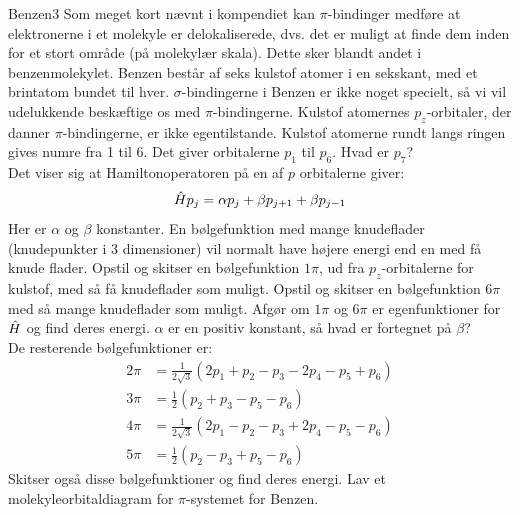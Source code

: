 \begin{opgave}{Benzen}{3}
Som meget kort nævnt i kompendiet kan $\pi$-bindinger medføre at elektronerne i et molekyle er delokaliserede, dvs. det er muligt at finde dem inden for et stort område (på molekylær skala). Dette sker blandt andet i benzenmolekylet. Benzen består af seks kulstof atomer i en sekskant, med et brintatom bundet til hver. $\sigma$-bindingerne i Benzen er ikke noget specielt, så vi vil udelukkende beskæftige os med $\pi$-bindingerne.
Kulstof atomernes $p_z$-orbitaler, der danner $\pi$-bindingerne, er ikke egentilstande. Kulstof atomerne rundt langs ringen gives numre fra 1 til 6. Det giver orbitalerne $p_1$ til $p_6$. 
\opg Hvad er $p_7$? \\
Det viser sig at Hamiltonoperatoren på en af $p$ orbitalerne giver:
$$
\hat H p_j = \alpha p_j+\beta p_{j+1}+\beta p_{j-1}
$$
Her er $\alpha$ og $\beta$ konstanter.
En bølgefunktion med mange knudeflader (knudepunkter i 3 dimensioner) vil normalt have højere energi end en med få knude flader.
\opg Opstil og skitser en bølgefunktion $1\pi$, ud fra $p_z$-orbitalerne for kulstof, med så få knudeflader som muligt.
\opg Opstil og skitser en bølgefunktion $6\pi$ med så mange knudeflader som muligt.
\opg Afgør om $1\pi$ og $6\pi$ er egenfunktioner for $\hat H$ og find deres energi.
\opg $\alpha$ er en positiv konstant, så hvad er fortegnet på $\beta$?\\ 
De resterende bølgefunktioner er:
\begin{align*}
2\pi &= \frac{1}{2\sqrt{3}}(2p_1+p_2-p_3-2p_4-p_5+p_6)\\
3\pi &= \frac{1}{2}(p_2+p_3-p_5-p_6)\\
4\pi &= \frac{1}{2\sqrt{3}}(2p_1-p_2-p_3+2p_4-p_5-p_6)\\
5\pi &= \frac{1}{2}(p_2-p_3+p_5-p_6)
\end{align*}
\opg Skitser også disse bølgefunktioner og find deres energi.
\opg Lav et molekyleorbitaldiagram for $\pi$-systemet for Benzen.
\end{opgave}

